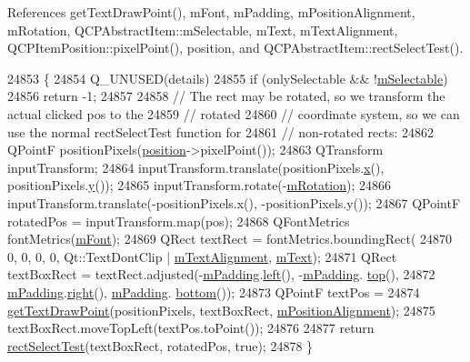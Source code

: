 References get\+Text\+Draw\+Point(), m\+Font, m\+Padding, m\+Position\+Alignment, m\+Rotation, Q\+C\+P\+Abstract\+Item\+::m\+Selectable, m\+Text, m\+Text\+Alignment, Q\+C\+P\+Item\+Position\+::pixel\+Point(), position, and Q\+C\+P\+Abstract\+Item\+::rect\+Select\+Test().


\begin{DoxyCode}
24853                                                         \{
24854   Q\_UNUSED(details)
24855   if (onlySelectable && !\hyperlink{class_q_c_p_abstract_item_ad81eb35c8726a0f458db9df9732e0e41}{mSelectable})
24856     return -1;
24857 
24858   \textcolor{comment}{// The rect may be rotated, so we transform the actual clicked pos to the}
24859   \textcolor{comment}{// rotated}
24860   \textcolor{comment}{// coordinate system, so we can use the normal rectSelectTest function for}
24861   \textcolor{comment}{// non-rotated rects:}
24862   QPointF positionPixels(\hyperlink{class_q_c_p_item_text_a0d228a00e819022b5690c65762721129}{position}->pixelPoint());
24863   QTransform inputTransform;
24864   inputTransform.translate(positionPixels.\hyperlink{_comparision_pictures_2_createtest_image_8m_a9336ebf25087d91c818ee6e9ec29f8c1}{x}(), positionPixels.\hyperlink{_comparision_pictures_2_createtest_image_8m_a2fb1c5cf58867b5bbc9a1b145a86f3a0}{y}());
24865   inputTransform.rotate(-\hyperlink{class_q_c_p_item_text_ac37df0061552225d2277e1ee3b48f2cb}{mRotation});
24866   inputTransform.translate(-positionPixels.x(), -positionPixels.y());
24867   QPointF rotatedPos = inputTransform.map(pos);
24868   QFontMetrics fontMetrics(\hyperlink{class_q_c_p_item_text_a1dc87fe2a824820d549ffd7e644eef8d}{mFont});
24869   QRect textRect = fontMetrics.boundingRect(
24870       0, 0, 0, 0, Qt::TextDontClip | \hyperlink{class_q_c_p_item_text_acdb2e50c38e83da00f083771efbd213f}{mTextAlignment}, \hyperlink{class_q_c_p_item_text_a2dec3e08c11f51639629374ecec3bd62}{mText});
24871   QRect textBoxRect = textRect.adjusted(-\hyperlink{class_q_c_p_item_text_ae7b3ef0ce6046efd4b346d28f2e1fb67}{mPadding}.\hyperlink{class_q_c_p_item_text_ab8c6c6e1df36256986fab1463c0a1d38}{left}(), -\hyperlink{class_q_c_p_item_text_ae7b3ef0ce6046efd4b346d28f2e1fb67}{mPadding}.
      \hyperlink{class_q_c_p_item_text_a5c87ee162cbbe3d166b97826c8849304}{top}(),
24872                                         \hyperlink{class_q_c_p_item_text_ae7b3ef0ce6046efd4b346d28f2e1fb67}{mPadding}.\hyperlink{class_q_c_p_item_text_aef159622ce6502412e782a21ba6d84f2}{right}(), \hyperlink{class_q_c_p_item_text_ae7b3ef0ce6046efd4b346d28f2e1fb67}{mPadding}.
      \hyperlink{class_q_c_p_item_text_a94aeec080f877d3d1d0c3d8ffc10e9e6}{bottom}());
24873   QPointF textPos =
24874       \hyperlink{class_q_c_p_item_text_aa6e478b1ce198eace89157c4cacc3ddc}{getTextDrawPoint}(positionPixels, textBoxRect, 
      \hyperlink{class_q_c_p_item_text_a6c27f7dc1a962a04b32430cf99f04654}{mPositionAlignment});
24875   textBoxRect.moveTopLeft(textPos.toPoint());
24876 
24877   return \hyperlink{class_q_c_p_abstract_item_a4c0e14c4e92df91174cb7183fb363069}{rectSelectTest}(textBoxRect, rotatedPos, true);
24878 \}
\end{DoxyCode}



